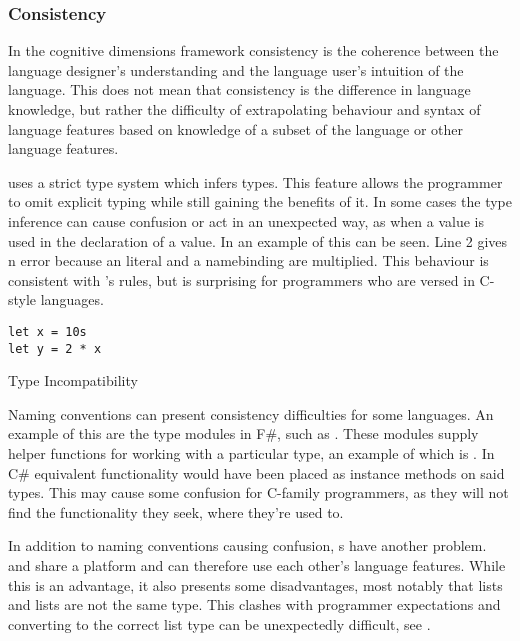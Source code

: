 \subsubsection{Consistency}
In the cognitive dimensions framework consistency is the coherence between the language designer's understanding and the language user's intuition of the language\cite{green1996usability}. This does not mean that consistency is the difference in language knowledge, but rather the difficulty of extrapolating behaviour and syntax of language features based on knowledge of a subset of the language or other language features.

\fs uses a strict type system which infers types. This feature allows the programmer to omit explicit typing while still gaining the benefits of it. In some cases the type inference can cause confusion or act in an unexpected way, as when a  value is used in the declaration of a  value. In  an example of this can be seen. Line 2 gives n error because an  literal and a  namebinding are multiplied. This behaviour is consistent with \fs's rules, but is surprising for programmers who are versed in C-style languages.

\begin{listing}[H]
\begin{verbatim}
let x = 10s
let y = 2 * x
\end{verbatim}
\caption{Type Incompatibility}
\label{lst:type-incompat}
\end{listing}

Naming conventions can present consistency difficulties for some languages. An example of this are the type modules in F\#, such as . These modules supply helper functions for working with a particular type, an example of which is . In C\# equivalent functionality would have been placed as instance methods on said types. This may cause some confusion for C-family programmers, as they will not find the functionality they seek, where they're used to.

In addition to naming conventions causing confusion, s have another problem. \fs and \cs share a platform and can therefore use each other's language features. While this is an advantage, it also presents some disadvantages, most notably that \fs lists and \cs lists are not the same type. This clashes with programmer expectations and converting to the correct list type can be unexpectedly difficult, see .

